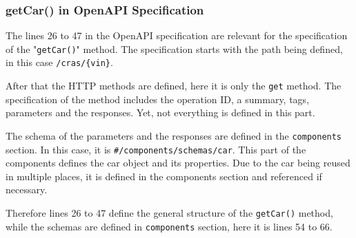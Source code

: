 \subsubsection*{getCar() in OpenAPI Specification}
The lines 26 to 47 in the OpenAPI specification are relevant for the specification of the "\texttt{getCar()}" method.
The specification starts with the path being defined, in this case \texttt{/cras/\{vin\}}.

After that the HTTP methods are defined, here it is only the \texttt{get} method.
The specification of the method includes the operation ID, a summary, tags, parameters and the responses.
Yet, not everything is defined in this part.

The schema of the parameters and the responses are defined in the \texttt{components} section.
In this case, it is \texttt{\#/components/schemas/car}.
This part of the components defines the car object and its properties.
Due to the car being reused in multiple places, it is defined in the components section and referenced if necessary.

Therefore lines 26 to 47 define the general structure of the \texttt{getCar()} method, while the schemas are defined in \texttt{components} section, here it is lines 54 to 66.